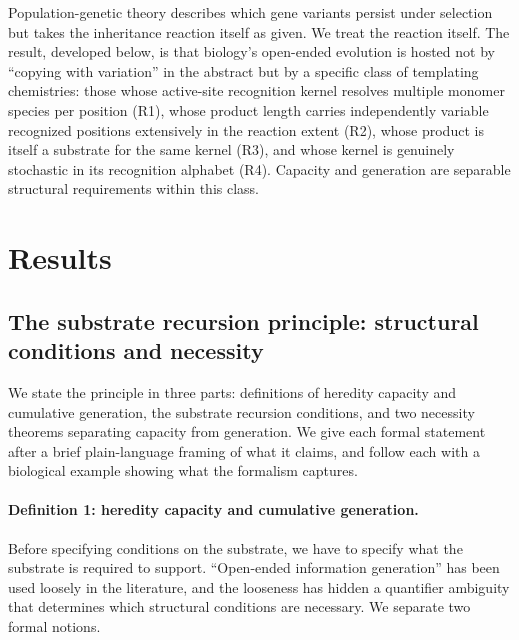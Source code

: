 \documentclass[aps,prx,reprint,amsmath,amssymb,floatfix,superscriptaddress,nofootinbib]{revtex4-2}
\theoremstyle{plain-thm}
\theoremstyle{definition-thm}
\begin{document}
Population-genetic theory describes which gene variants persist under selection but takes the inheritance reaction itself as given. We treat the reaction itself. The result, developed below, is that biology's open-ended evolution is hosted not by ``copying with variation'' in the abstract but by a specific class of templating chemistries: those whose active-site recognition kernel resolves multiple monomer species per position (R1), whose product length carries independently variable recognized positions extensively in the reaction extent (R2), whose product is itself a substrate for the same kernel (R3), and whose kernel is genuinely stochastic in its recognition alphabet (R4). Capacity and generation are separable structural requirements within this class.


\section{Results}

\subsection{The substrate recursion principle: structural conditions and necessity}

We state the principle in three parts: definitions of heredity capacity and cumulative generation, the substrate recursion conditions, and two necessity theorems separating capacity from generation. We give each formal statement after a brief plain-language framing of what it claims, and follow each with a biological example showing what the formalism captures.

\paragraph{Definition 1: heredity capacity and cumulative generation.}

Before specifying conditions on the substrate, we have to specify what the substrate is required to support. ``Open-ended information generation'' has been used loosely in the literature, and the looseness has hidden a quantifier ambiguity that determines which structural conditions are necessary. We separate two formal notions.
\end{document}
